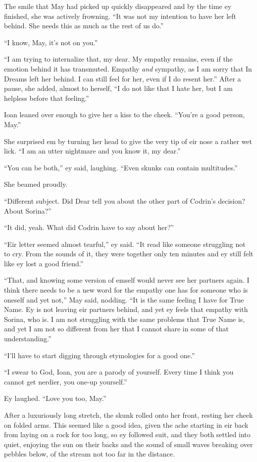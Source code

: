 The smile that May had picked up quickly disappeared and by the time ey finished, she was actively frowning. ``It was not my intention to have her left behind. She needs this as much as the rest of us do.''

``I know, May, it's not on you.''

``I am trying to internalize that, my dear. My empathy remains, even if the emotion behind it has transmuted. Empathy \emph{and} sympathy, as I am sorry that In Dreams left her behind. I can still feel for her, even if I do resent her.'' After a pause, she added, almost to herself, ``I do not like that I hate her, but I am helpless before that feeling.''

Ioan leaned over enough to give her a kiss to the cheek. ``You're a good person, May.''

She surprised em by turning her head to give the very tip of eir nose a rather wet lick. ``I am an utter nightmare and you know it, my dear.''

``You can be both,'' ey said, laughing. ``Even skunks can contain multitudes.''

She beamed proudly.

``Different subject. Did Dear tell you about the other part of Codrin's decision? About Sorina?''

``It did, yeah. What did Codrin have to say about her?''

``Eir letter seemed almost tearful,'' ey said. ``It read like someone struggling not to cry. From the sounds of it, they were together only ten minutes and ey still felt like ey lost a good friend.''

``That, and knowing some version of emself would never see her partners again. I think there needs to be a new word for the empathy one has for someone who is oneself and yet not,'' May said, nodding. ``It is the same feeling I have for True Name. Ey is not leaving eir partners behind, and yet ey feels that empathy with Sorina, who is. I am not struggling with the same problems that True Name is, and yet I am not so different from her that I cannot share in some of that understanding.''

``I'll have to start digging through etymologies for a good one.''

``I swear to God, Ioan, you are a parody of yourself. Every time I think you cannot get nerdier, you one-up yourself.''

Ey laughed. ``Love you too, May.''

After a luxuriously long stretch, the skunk rolled onto her front, resting her cheek on folded arms. This seemed like a good idea, given the ache starting in eir back from laying on a rock for too long, so ey followed suit, and they both settled into quiet, enjoying the sun on their backs and the sound of small waves breaking over pebbles below, of the stream not too far in the distance.

